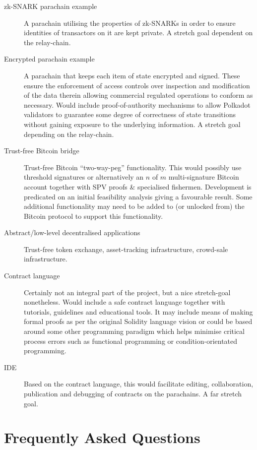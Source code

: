 \documentclass[t,usepdftitle=false]{beamer}
\begin{document}
\begin{frame}
\begin{description}
\item[zk-SNARK parachain example] A parachain utilising the properties of zk-SNARKs in order to ensure identities of transactors on it are kept private. A stretch goal dependent on the relay-chain.

\item[Encrypted parachain example] A parachain that keeps each item of state encrypted and signed. These ensure the enforcement of access controls over inspection and modification of the data therein allowing commercial regulated operations to conform as necessary. Would include proof-of-authority mechanisms to allow Polkadot validators to guarantee some degree of correctness of state transitions without gaining exposure  to the underlying information. A stretch goal depending on the relay-chain.

\item[Trust-free Bitcoin bridge] Trust-free Bitcoin ``two-way-peg'' functionality. This would possibly use threshold signatures or alternatively an $n$ of $m$ multi-signature Bitcoin account together with SPV proofs \& specialised fishermen. Development is predicated on an initial feasibility analysis giving a favourable result. Some additional functionality may need to be added to (or unlocked from) the Bitcoin protocol to support this functionality.

\item[Abstract/low-level decentralised applications] Trust-free token exchange, asset-tracking infrastructure, crowd-sale infrastructure.

\item[Contract language] Certainly not an integral part of the project, but a nice stretch-goal nonetheless. Would include a safe contract language together with tutorials, guidelines and educational tools. It may include means of making formal proofs as per the original Solidity language vision or could be based around some other programming paradigm which helps minimise critical process errors such as functional programming or condition-orientated programming.

\item[IDE] Based on the contract language, this would facilitate editing, collaboration, publication and debugging of contracts on the parachains. A far stretch goal.

\end{description}

% 

\section{Frequently Asked Questions}


\end{frame}
\end{document}
